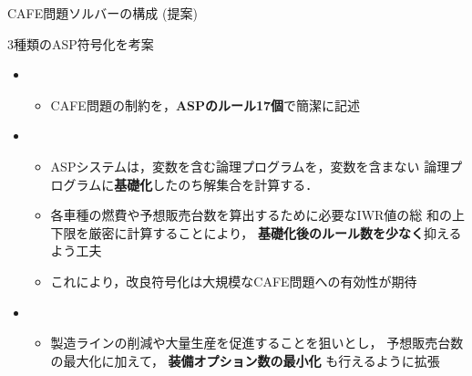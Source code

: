 \documentclass[dvipdfmx, 11pt]{beamer}
\begin{document}
 \begin{frame}{CAFE問題ソルバーの構成 (提案)}
   \scalebox{0.9}{\centering}
   \begin{block}{3種類のASP符号化を考案}
     \begin{itemize}
     \item {}
       \begin{itemize}\footnotesize
       \item CAFE問題の制約を，\textbf{ASPのルール17個}で簡潔に記述
       \end{itemize}
     \item {}
       \begin{itemize}\footnotesize
       \item ASPシステムは，変数を含む論理プログラムを，変数を含まない
         論理プログラムに\textbf{基礎化}したのち解集合を計算する．
       \item 各車種の燃費や予想販売台数を算出するために必要なIWR値の総
         和の上下限を厳密に計算することにより，
         \textbf{基礎化後のルール数を少なく}抑えるよう工夫
       \item これにより，改良符号化は大規模なCAFE問題への有効性が期待
       \end{itemize}
     \item {}
       \begin{itemize}\footnotesize
         \item 製造ラインの削減や大量生産を促進することを狙いとし，
           予想販売台数の最大化に加えて，
           \textbf{装備オプション数の最小化}
           も行えるように拡張
       \end{itemize}
     \end{itemize}
   \end{block}
 \end{frame}
\end{document}

